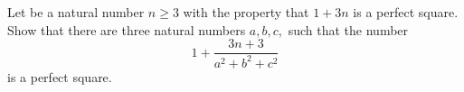 Let be a natural number $ n\ge 3 $ with the property that $ 1+3n $ is a perfect square. Show that there are three natural numbers $ a,b,c, $ such that the number
$$ 1+\frac{3n+3}{a^2+b^2+c^2} $$is a perfect square.
